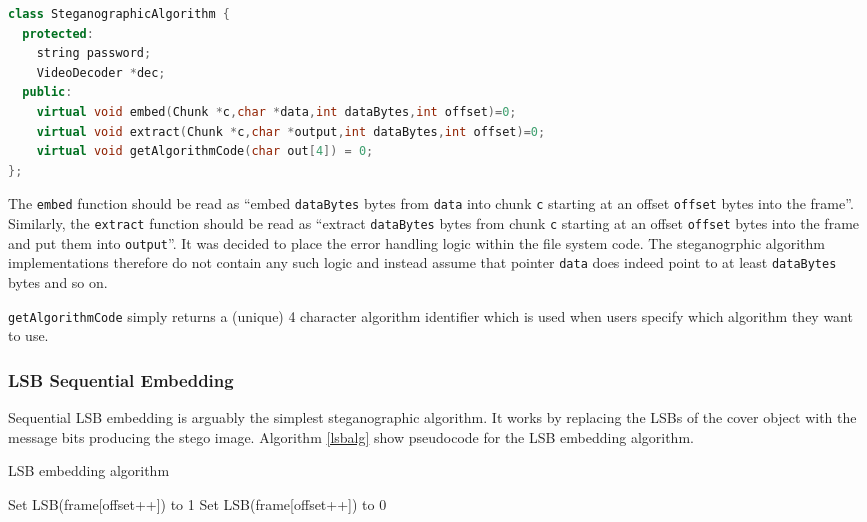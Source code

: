 \documentclass[paper=a4, fontsize=11pt,twoside]{scrartcl}    %
\numberwithin{table}{section}
\numberwithin{figure}{section}
\numberwithin{algorithm}{section}
\begin{document}
\begin{lstlisting}[language=C++, caption={\texttt{Stego Algorithm} interface (\texttt{steg/steganographic\_algorithm.h:8})}, frame=single, label=stegoalg]
class SteganographicAlgorithm {
  protected:
    string password;
    VideoDecoder *dec;
  public:
    virtual void embed(Chunk *c,char *data,int dataBytes,int offset)=0;
    virtual void extract(Chunk *c,char *output,int dataBytes,int offset)=0;
    virtual void getAlgorithmCode(char out[4]) = 0;
};
\end{lstlisting}

\noindent
The \texttt{embed} function should be read as ``embed \texttt{dataBytes} bytes from \texttt{data} into chunk \texttt{c} starting at an offset \texttt{offset} bytes into the frame''. Similarly, the \texttt{extract} function should be read as ``extract \texttt{dataBytes} bytes from chunk \texttt{c} starting at an offset \texttt{offset} bytes into the frame and put them into \texttt{output}''. It was decided to place the error handling logic within the file system code. The steganogrphic algorithm implementations therefore do not contain any such logic and instead assume that pointer \texttt{data} does indeed point to at least \texttt{dataBytes} bytes and so on.

\texttt{getAlgorithmCode} simply returns a (unique) 4 character algorithm identifier which is used when users specify which algorithm they want to use.


\subsubsection{LSB Sequential Embedding}

Sequential LSB embedding is arguably the simplest steganographic algorithm. It works by replacing the LSBs of the cover object with the message bits producing the stego image. Algorithm \ref{lsbalg} show pseudocode for the LSB embedding algorithm.

\begin{algorithm}
\caption{LSB embedding algorithm}
\label{lsbalg}
\begin{algorithmic}[1]
			\State Set LSB(frame[offset++]) to 1
		\Else
			\State Set LSB(frame[offset++]) to 0
		\EndIf
	\EndFor
\EndFor
\end{algorithmic}
\end{algorithm}
\end{document}
